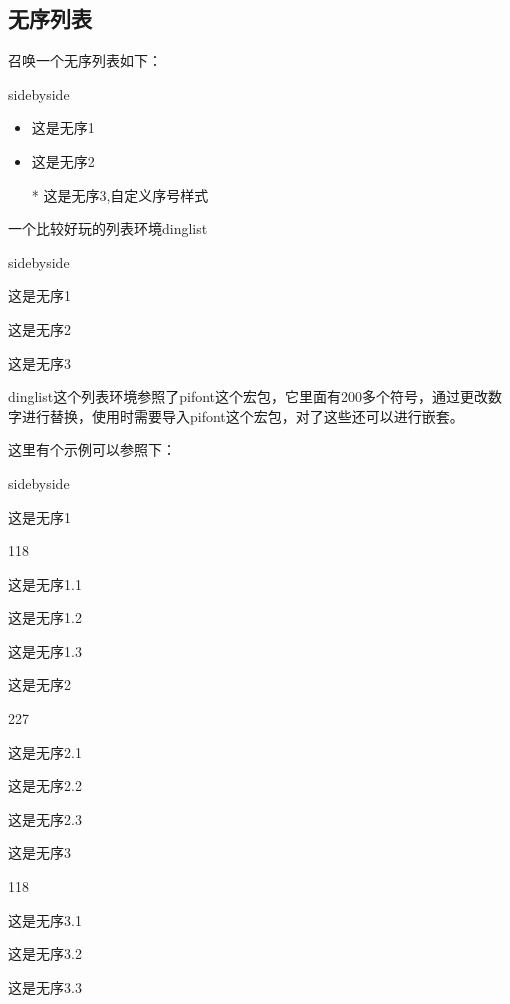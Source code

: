 \documentclass[cn,chinese,color=cyan]{elegantbook}
\begin{document}
\subsection{无序列表}
召唤一个无序列表如下：
\begin{tcblisting}{sidebyside}
\begin{itemize}
\item 这是无序1
\item 这是无序2
\item [*] 这是无序3,自定义序号样式
\end{itemize}
\end{tcblisting}
一个比较好玩的列表环境dinglist
\begin{tcblisting}{sidebyside}
\begin{dinglist}{47}
\item 这是无序1
\item 这是无序2
\item 这是无序3
\end{dinglist}
\end{tcblisting}
\begin{note}
	dinglist这个列表环境参照了pifont这个宏包，它里面有200多个符号，通过更改数字进行替换，使用时需要导入pifont这个宏包，对了这些还可以进行嵌套。
\end{note}

这里有个示例可以参照下：

\begin{tcblisting}{sidebyside}
\begin{dinglist}{47}
\item 这是无序1
\begin{dinglist}{118}
\item 这是无序1.1
\item 这是无序1.2
\item 这是无序1.3
\end{dinglist}
\item 这是无序2
\begin{dinglist}{227}
\item 这是无序2.1
\item 这是无序2.2
\item 这是无序2.3
\end{dinglist}
\item 这是无序3
\begin{dinglist}{118}
\item 这是无序3.1
\item 这是无序3.2
\item 这是无序3.3
\end{dinglist}
\end{dinglist}
\end{tcblisting}
\end{document}
